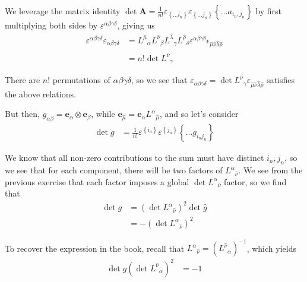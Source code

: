 \documentclass[12pt]{report}
\newcommand{\bm}[1]{\boldsymbol{\mathbf{#1}}}
\begin{document}
\begin{description}
        We leverage the matrix identity $\det \bm{A} = \frac{1}{n!}
        \varepsilon_{\left\{ \dots i_n \right\}}
        \varepsilon_{\left\{ \dots j_n \right\}}
        \left\{ \dots a_{i_n, j_n} \right\}$ by first multiplying both
        sides by $\varepsilon^{\alpha\beta\gamma\delta}$, giving us
        \begin{align*}
            \varepsilon^{\alpha\beta\gamma\delta}
                \varepsilon_{\alpha\beta\gamma\delta}
            &=
                {L^{\hat{\mu}}}_\alpha
                {L^{\hat{\nu}}}_\beta
                {L^{\hat{\lambda}}}_\gamma
                {L^{\hat{\rho}}}_\delta
                \varepsilon^{\alpha\beta\gamma\delta}
                \epsilon_{\hat{\mu}\hat{\nu}\hat{\lambda}\hat{\rho}}\\
            &= n! \det {L^{\hat{\nu}}}_{\gamma}
        \end{align*}

        There are $n!$ permutations of $\alpha\beta\gamma\delta$, so we see that
        $\varepsilon_{\alpha\beta\gamma\delta} = \det {L^{\hat{\nu}}}_{\gamma}
        \varepsilon_{\hat{\mu}\hat{\nu}\hat{\lambda}\hat{\rho}}$ satisfies the
        above relations.

        But then, $g_{\alpha\beta} = \bm{e}_\alpha \otimes \bm{e}_\beta$, while
        $\bm{e}_{\hat{\mu}} = \bm{e}_\alpha {L^\alpha}_{\hat{\mu}}$, and
        so let's consider
        \begin{align*}
            \det g &= \frac{1}{n!}\varepsilon^{\left\{ i_n \right\}}
                \varepsilon^{\left\{ j_n \right\}}
                \left\{ \dots g_{i_nj_n} \right\}
        \end{align*}

        We know that all non-zero contributions to the sum must have distinct
        $i_n, j_n$, so we see that for each component, there will be two factors
        of ${L^\alpha}_{\hat{\nu}}$. We see from the previous exercise that each
        factor imposes a global $\det {L^\alpha}_{\hat{\nu}}$ factor, so we find
        that
        \begin{align*}
            \det g &= \left( \det {L^\alpha}_{\hat{\nu}} \right)^2 \det
                \hat{g}\\
            &= -\left( \det {L^\alpha}_{\hat{\nu}} \right)^2
        \end{align*}

        To recover the expression in the book, recall that $
        {L^\alpha}_{\hat{\nu}} = \left( {L^{\hat{\nu}}}_\alpha \right)^{-1}$,
        which yields
        \begin{align*}
            \det g \left( \det {L^{\hat{\nu}}}_\alpha \right)^2 &= -1
        \end{align*}


\end{description}
\end{document}
